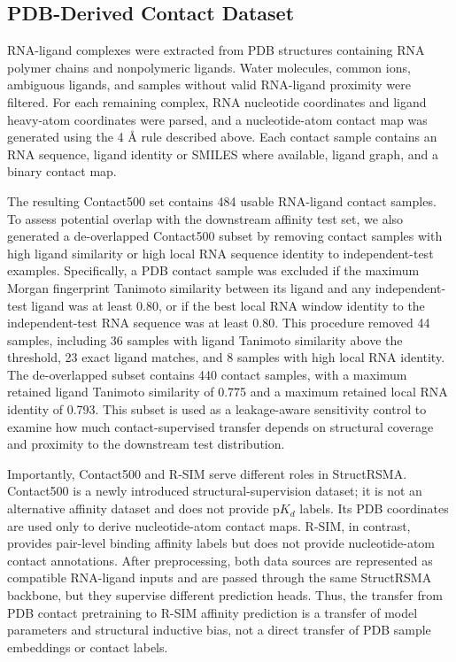 ﻿\documentclass[journal=jcisd8,manuscript=article]{achemso}
\begin{document}
\subsection{PDB-Derived Contact Dataset}

RNA-ligand complexes were extracted from PDB structures containing RNA polymer chains and nonpolymeric ligands. Water molecules, common ions, ambiguous ligands, and samples without valid RNA-ligand proximity were filtered. For each remaining complex, RNA nucleotide coordinates and ligand heavy-atom coordinates were parsed, and a nucleotide-atom contact map was generated using the 4 \AA{} rule described above. Each contact sample contains an RNA sequence, ligand identity or SMILES where available, ligand graph, and a binary contact map.

The resulting Contact500 set contains 484 usable RNA-ligand contact samples. To assess potential overlap with the downstream affinity test set, we also generated a de-overlapped Contact500 subset by removing contact samples with high ligand similarity or high local RNA sequence identity to independent-test examples. Specifically, a PDB contact sample was excluded if the maximum Morgan fingerprint Tanimoto similarity between its ligand and any independent-test ligand was at least 0.80, or if the best local RNA window identity to the independent-test RNA sequence was at least 0.80. This procedure removed 44 samples, including 36 samples with ligand Tanimoto similarity above the threshold, 23 exact ligand matches, and 8 samples with high local RNA identity. The de-overlapped subset contains 440 contact samples, with a maximum retained ligand Tanimoto similarity of 0.775 and a maximum retained local RNA identity of 0.793. This subset is used as a leakage-aware sensitivity control to examine how much contact-supervised transfer depends on structural coverage and proximity to the downstream test distribution.

Importantly, Contact500 and R-SIM serve different roles in StructRSMA. Contact500 is a newly introduced structural-supervision dataset; it is not an alternative affinity dataset and does not provide p$K_d$ labels. Its PDB coordinates are used only to derive nucleotide-atom contact maps. R-SIM, in contrast, provides pair-level binding affinity labels but does not provide nucleotide-atom contact annotations. After preprocessing, both data sources are represented as compatible RNA-ligand inputs and are passed through the same StructRSMA backbone, but they supervise different prediction heads. Thus, the transfer from PDB contact pretraining to R-SIM affinity prediction is a transfer of model parameters and structural inductive bias, not a direct transfer of PDB sample embeddings or contact labels.
\end{document}
